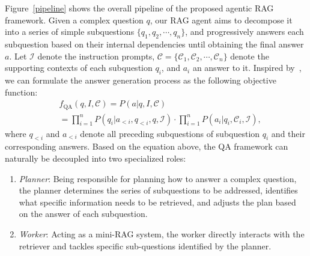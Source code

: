 Figure~\ref{pipeline} shows the overall pipeline of the proposed agentic RAG framework. Given a complex question $q$, our RAG agent aims to decompose it into a series of simple subquestions $\{q_1, q_2, \cdots, q_n\}$, and progressively answers each subquestion based on their internal dependencies until obtaining the final answer $a$. Let $\mathcal{I}$ denote the instruction prompts, $\mathcal{C} = \{
\mathcal{C}_1, \mathcal{C}_2, \cdots, \mathcal{C}_n\}$ denote the supporting contexts of each subquestion $q_i$, and $a_i$ an answer to it. Inspired by~\cite{Search-o1}, we can formulate the answer generation process as the following objective function: 
\begin{equation}~\label{decoupling}
\begin{aligned}
   &f_{\text{QA}}(q,I,\mathcal{C}) = P(a|q, I,\mathcal{C}) \\ &= \prod_{i=1}^n{P(q_i|a_{<i}, q_{<i}, q, \mathcal{I})} \cdot \prod_{i=1}^n{P(a_i|q_i,\mathcal{C}_i,\mathcal{I})},
\end{aligned}
\end{equation}
where $q_{<i}$ and $a_{<i}$ denote all preceding subquestions of subquestion $q_i$ and their corresponding answers. Based on the equation above, 
the QA framework can naturally be decoupled into two specialized roles:
\begin{enumerate}[label=\arabic{enumi})]
    \item \emph{Planner}: {Being responsible for planning how to answer a complex question, the planner determines the series of subquestions to be addressed, identifies what specific information needs to be retrieved, and adjusts the plan based on the answer of each subquestion. } 
    \item \emph{Worker}: {Acting as a mini-RAG system, the worker directly interacts with the retriever and tackles specific sub-questions identified by the planner. }
\end{enumerate}

